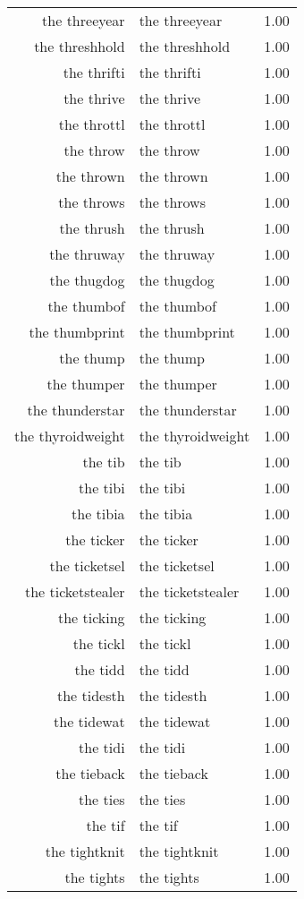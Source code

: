 \begin{table}[ht]
\begin{tabular}{rlr}
  the threeyear & the threeyear & 1.00 \\ 
  the threshhold & the threshhold & 1.00 \\ 
  the thrifti & the thrifti & 1.00 \\ 
  the thrive & the thrive & 1.00 \\ 
  the throttl & the throttl & 1.00 \\ 
  the throw & the throw & 1.00 \\ 
  the thrown & the thrown & 1.00 \\ 
  the throws & the throws & 1.00 \\ 
  the thrush & the thrush & 1.00 \\ 
  the thruway & the thruway & 1.00 \\ 
  the thugdog & the thugdog & 1.00 \\ 
  the thumbof & the thumbof & 1.00 \\ 
  the thumbprint & the thumbprint & 1.00 \\ 
  the thump & the thump & 1.00 \\ 
  the thumper & the thumper & 1.00 \\ 
  the thunderstar & the thunderstar & 1.00 \\ 
  the thyroidweight & the thyroidweight & 1.00 \\ 
  the tib & the tib & 1.00 \\ 
  the tibi & the tibi & 1.00 \\ 
  the tibia & the tibia & 1.00 \\ 
  the ticker & the ticker & 1.00 \\ 
  the ticketsel & the ticketsel & 1.00 \\ 
  the ticketstealer & the ticketstealer & 1.00 \\ 
  the ticking & the ticking & 1.00 \\ 
  the tickl & the tickl & 1.00 \\ 
  the tidd & the tidd & 1.00 \\ 
  the tidesth & the tidesth & 1.00 \\ 
  the tidewat & the tidewat & 1.00 \\ 
  the tidi & the tidi & 1.00 \\ 
  the tieback & the tieback & 1.00 \\ 
  the ties & the ties & 1.00 \\ 
  the tif & the tif & 1.00 \\ 
  the tightknit & the tightknit & 1.00 \\ 
  the tights & the tights & 1.00 \\ 

\end{tabular}
\end{table}
